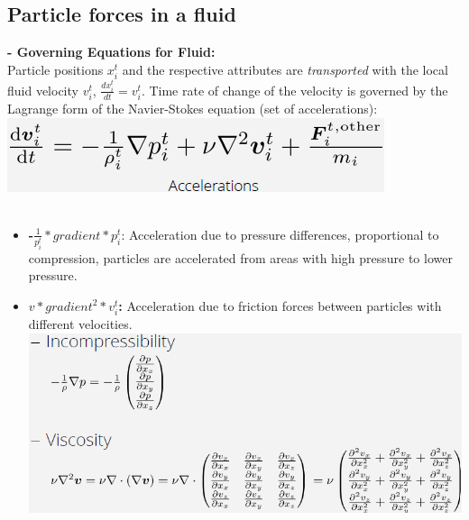 \documentclass{article}
\begin{document}
\subsection{Particle forces in a fluid}
\textbf{- Governing Equations for Fluid: }\\
Particle positions $x_i^t$ and the respective attributes are \textit{transported }with the local fluid velocity $v_i^t$, $\frac{dx_i^t}{dt}=v_ i^t$. Time rate of change of the velocity is governed by the Lagrange form of the Navier-Stokes equation (set of accelerations): \\
\includegraphics[scale=0.5]{image93.png}\\\\
\begin{itemize}
\item \textbf{-$\frac{1}{p_i^t}*gradient*p_i^t$}: Acceleration due to pressure differences, proportional to compression, particles are accelerated from areas with high pressure to lower pressure.
\item \textbf{$v*gradient^2*v_i^t$: }Acceleration due to friction forces between particles with different velocities.
\includegraphics[scale=0.5]{image94.png}
\end{itemize}
\end{document}
